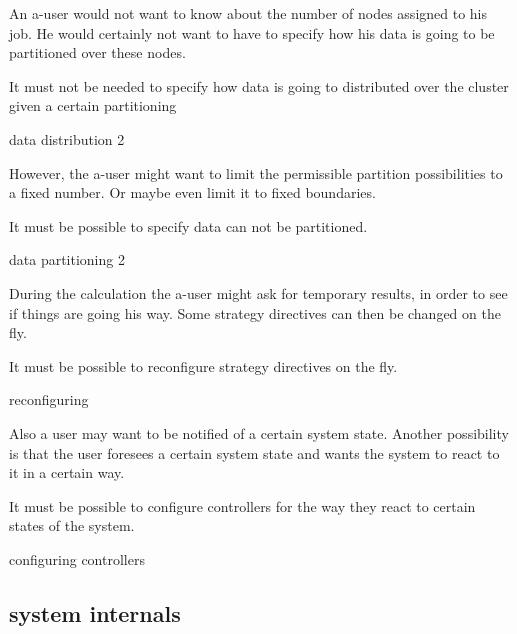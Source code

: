 \documentclass[]{lofar}
\begin{document}
        An a-user would not want to know about the number of nodes
        assigned to his job. He would certainly not want to have to
        specify how his data is going to be partitioned over these
        nodes. 

        \begin{requirement}
          It must not be needed to specify how data is going to
          distributed over the cluster given a certain partitioning
          \caption{data distribution 2\label{req:data-distribution-2}}
        \end{requirement}

        However, the a-user might want to limit the permissible
        partition possibilities to a fixed number. Or maybe even limit
        it to fixed boundaries.

        \begin{requirement}
          It must be possible to specify data can not be partitioned.
          \caption{data partitioning 2\label{req:data-partitioning-2}}
        \end{requirement}

        During the calculation the a-user might ask for temporary
        results, in order to see if things are going his way. Some
        strategy directives can then be changed on the fly.

        \begin{requirement}
          It must be possible to reconfigure strategy directives on
          the fly.
          \caption{reconfiguring\label{req:reconfiguring}}
        \end{requirement}

        Also a user may want to be notified of a certain system
        state. Another possibility is that the user foresees a certain
        system state and wants the system to react to it in a certain
        way.

        \begin{requirement}
          It must be possible to configure controllers for the way
          they react to certain states of the system.
          \footnotemark[\value{footnote}]
          \caption{configuring controllers\label{req:configure-controllers}}
        \end{requirement}

    \subsection{system internals}
\end{document}
